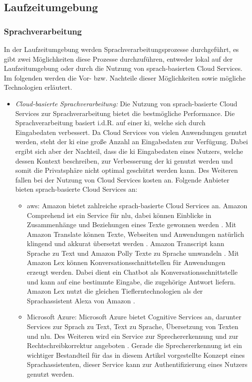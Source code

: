 \subsection{Laufzeitumgebung}
\subsubsection{Sprachverarbeitung}
In der Laufzeitumgebung werden Sprachverarbeitungsprozesse durchgeführt, es gibt zwei Möglichkeiten diese Prozesse durchzuführen, entweder lokal auf der Laufzeitumgebung oder durch die Nutzung von sprach-basierten Cloud Services. Im folgenden werden die Vor- bzw. Nachteile dieser Möglichkeiten sowie mögliche Technologien erläutert.
\begin{itemize}
	\item \textsl{Cloud-basierte Sprachverarbeitung:} Die Nutzung von sprach-basierte Cloud Services zur Sprachverarbeitung bietet die bestmögliche Performance. Die Sprachverarbeitung basiert i.d.R. auf einer \ac{ki}, welche sich durch Eingabedaten verbessert. Da Cloud Services von vielen Anwendungen genutzt werden, steht der \ac{ki} eine große Anzahl an Eingabedaten zur Verfügung. Dabei ergibt sich aber der Nachteil, dass die \ac{ki} Eingabedaten eines Nutzers, welche dessen Kontext beschreiben, zur Verbesserung der \ac{ki} genutzt werden und somit die Privatsphäre nicht optimal geschützt werden kann. Des Weiteren fallen bei der Nutzung von Cloud Services kosten an. Folgende Anbieter bieten sprach-basierte Cloud Services an:
	\begin{itemize}
		\item \ac{aws}: Amazon bietet zahlreiche sprach-basierte Cloud Services an. Amazon Comprehend ist ein Service für \ac{nlu}, dabei können Einblicke in Zusammenhänge und Beziehungen eines Texte gewonnen werden \cite{AmazonComprehed}. Mit Amazon Translate können Texte, Webseiten und Anwendungen natürlich klingend und akkurat übersetzt werden \cite{AmazonTranslate}. Amazon Transcript kann Sprache zu Text und Amazon Polly Texte zu Sprache umwandeln \cite{AmazonTranscript} \cite{AmazonPolly}. Mit Amazon Lex können Konversationsschnittstellen für Anwendungen erzeugt werden. Dabei dient ein Chatbot als Konversationsschnittstelle und kann auf eine bestimmte Eingabe, die zugehörige Antwort liefern. Amazon Lex nutzt die gleichen Tieflerntechnologien als der Sprachassistent Alexa von Amazon \cite{AmazonLex}.
		\item Microsoft Azure: Microsoft Azure bietet Cognitive Services an, darunter Services zur Sprach zu Text, Text zu Sprache, Übersetzung von Texten und \ac{nlu}. Des Weiteren wird ein Service zur Sprechererkennung und zur Rechtschreibkorrektur angeboten \cite{MicrosoftAzureCognitiveServices}. Gerade die Sprechererkennung ist ein wichtiger Bestandteil für das in diesem Artikel vorgestellte Konzept eines Sprachassistenten, dieser Service kann zur Authentifizierung eines Nutzers genutzt werden. 

\end{itemize}
\end{itemize}
